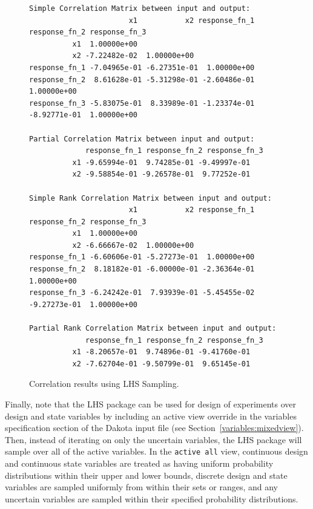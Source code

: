 \begin{figure}[htbp!]
\centering
\begin{bigbox}
\begin{small}
\begin{verbatim}
Simple Correlation Matrix between input and output:
                       x1           x2 response_fn_1 response_fn_2 response_fn_3
          x1  1.00000e+00
          x2 -7.22482e-02  1.00000e+00
response_fn_1 -7.04965e-01 -6.27351e-01  1.00000e+00
response_fn_2  8.61628e-01 -5.31298e-01 -2.60486e-01  1.00000e+00
response_fn_3 -5.83075e-01  8.33989e-01 -1.23374e-01 -8.92771e-01  1.00000e+00

Partial Correlation Matrix between input and output:
             response_fn_1 response_fn_2 response_fn_3
          x1 -9.65994e-01  9.74285e-01 -9.49997e-01
          x2 -9.58854e-01 -9.26578e-01  9.77252e-01

Simple Rank Correlation Matrix between input and output:
                       x1           x2 response_fn_1 response_fn_2 response_fn_3
          x1  1.00000e+00
          x2 -6.66667e-02  1.00000e+00
response_fn_1 -6.60606e-01 -5.27273e-01  1.00000e+00
response_fn_2  8.18182e-01 -6.00000e-01 -2.36364e-01  1.00000e+00
response_fn_3 -6.24242e-01  7.93939e-01 -5.45455e-02 -9.27273e-01  1.00000e+00

Partial Rank Correlation Matrix between input and output:
             response_fn_1 response_fn_2 response_fn_3
          x1 -8.20657e-01  9.74896e-01 -9.41760e-01
          x2 -7.62704e-01 -9.50799e-01  9.65145e-01
\end{verbatim}
\end{small}
\end{bigbox}
\caption{Correlation results using LHS Sampling.}
\label{uq:figure04}
\end{figure}

Finally, note that the LHS package can be used for design of
experiments over design and state variables by including an active
view override in the variables specification section of the Dakota
input file (see Section~\ref{variables:mixedview}). Then, instead of
iterating on only the uncertain variables, the LHS package will sample
over all of the active variables. In the \texttt{active all} view,
continuous design and continuous state variables are treated as having
uniform probability distributions within their upper and lower bounds,
discrete design and state variables are sampled uniformly from within
their sets or ranges, and any uncertain variables are sampled within
their specified probability distributions.


